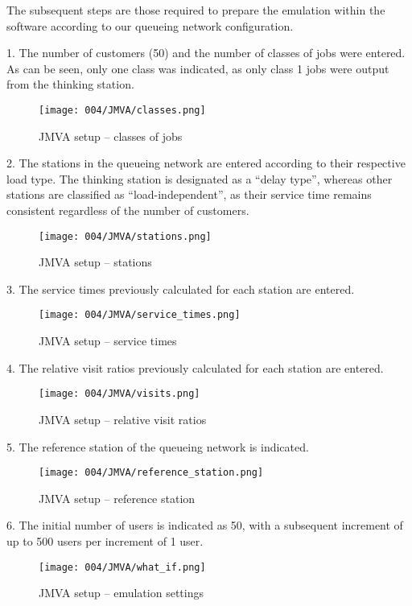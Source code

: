 The subsequent steps are those required to prepare the emulation within the software according to our queueing network configuration.

\clearpage

1.
The number of customers (50) and the number of classes of jobs were entered.
As can be seen, only one class was indicated, as only class 1 jobs were output from the thinking station.
\begin{figure}[h]
	\centering
	\texttt{[image: 004/JMVA/classes.png]}
	\caption{JMVA setup -- classes of jobs}
\end{figure}

2.
The stations in the queueing network are entered according to their respective load type.
The thinking station is designated as a ``delay type'', whereas other stations are classified as ``load-independent'', as their service time remains consistent regardless of the number of customers.
\begin{figure}[h]
	\centering
	\texttt{[image: 004/JMVA/stations.png]}
	\caption{JMVA setup -- stations}
\end{figure}

\clearpage

3.
The service times previously calculated for each station are entered.
\begin{figure}[h]
	\centering
	\texttt{[image: 004/JMVA/service\_times.png]}
	\caption{JMVA setup -- service times}
\end{figure}

4.
The relative visit ratios previously calculated for each station are entered.
\begin{figure}[h]
	\centering
	\texttt{[image: 004/JMVA/visits.png]}
	\caption{JMVA setup -- relative visit ratios}
\end{figure}

\clearpage

5.
The reference station of the queueing network is indicated.
\begin{figure}[h]
	\centering
	\texttt{[image: 004/JMVA/reference\_station.png]}
	\caption{JMVA setup -- reference station}
\end{figure}

6.
The initial number of users is indicated as 50, with a subsequent increment of up to 500 users per increment of 1 user.
\begin{figure}[h]
	\centering
	\texttt{[image: 004/JMVA/what\_if.png]}
	\caption{JMVA setup -- emulation settings}
\end{figure}

